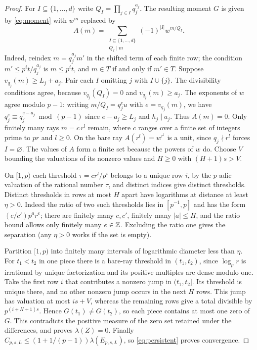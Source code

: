 \documentclass[11pt]{article}
\newcommand{\vol}{\lambda}
\begin{document}
\begin{proof}
For $I\subseteq\{1,\dots,d\}$ write $Q_I=\prod_{j\in I}q_j^{a_j}$. The resulting moment $G$ is given by \eqref{eq:moment} with $w^m$ replaced by
\[
 A(m)=\sum_{\substack{I\subseteq\{1,\dots,d\}\\Q_I\mid m}}(-1)^{|I|}w^{m/Q_I}.
\]
Indeed, reindex $m=q_j^{a_j}m'$ in the shifted term of each finite row; the condition $m'\le p^it/q_j^{a_j}$ is $m\le p^it$, and $m\in T$ if and only if $m'\in T$. Suppose $v_{q_j}(m)\ge L_j+a_j$. Pair each $I$ omitting $j$ with $I\cup\{j\}$. The divisibility conditions agree, because $v_{q_j}(Q_I)=0$ and $v_{q_j}(m)\ge a_j$. The exponents of $w$ agree modulo $p-1$: writing $m/Q_I=q_j^eu$ with $e=v_{q_j}(m)$, we have $q_j^{e}\equiv q_j^{e-a_j}\bmod(p-1)$ since $e-a_j\ge L_j$ and $h_j\mid a_j$. Thus $A(m)=0$. Only finitely many rays $m=c\,r^l$ remain, where $c$ ranges over a finite set of integers prime to $pr$ and $l\ge0$. On the bare ray $A(r^l)=w^{r^l}$ is a unit, since $q_j\nmid r^l$ forces $I=\varnothing$. The values of $A$ form a finite set because the powers of $w$ do. Choose $V$ bounding the valuations of its nonzero values and $H\ge0$ with $(H+1)s>V$.

On $[1,p)$ each threshold $\tau=cr^l/p^i$ belongs to a unique row $i$, by the $p$-adic valuation of the rational number $\tau$, and distinct indices give distinct thresholds. Distinct thresholds in rows at most $H$ apart have logarithms at distance at least $\eta>0$. Indeed the ratio of two such thresholds lies in $[p^{-1},p]$ and has the form $(c/c')p^ar^e$; there are finitely many $c,c'$, finitely many $|a|\le H$, and the ratio bound allows only finitely many $e\in\mathbb Z$. Excluding the ratio one gives the separation (any $\eta>0$ works if the set is empty).

Partition $[1,p)$ into finitely many intervals of logarithmic diameter less than $\eta$. For $t_1<t_2$ in one piece there is a bare-ray threshold in $(t_1,t_2)$, since $\log_pr$ is irrational by unique factorization and its positive multiples are dense modulo one. Take the first row $i$ that contributes a nonzero jump in $(t_1,t_2]$. Its threshold is unique there, and no other nonzero jump occurs in the next $H$ rows. This jump has valuation at most $is+V$, whereas the remaining rows give a total divisible by $p^{(i+H+1)s}$. Hence $G(t_1)\ne G(t_2)$, so each piece contains at most one zero of $G$. This contradicts the positive measure of the zero set retained under the differences, and proves $\vol(Z)=0$. Finally $C_{p,s,L}\le(1+1/(p-1))\vol(E_{p,s,L})$, so \eqref{eq:persistent} proves convergence.
\end{proof}
\end{document}
